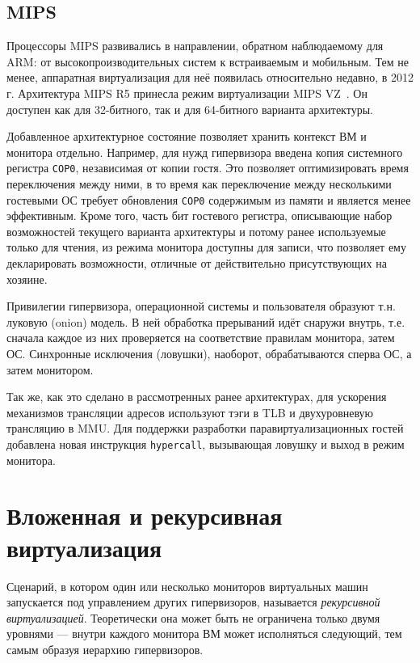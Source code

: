 \subsection{MIPS}

Процессоры MIPS развивались в направлении, обратном наблюдаемому для ARM: от высокопроизводительных систем к встраиваемым и мобильным. Тем не менее, аппаратная виртуализация для неё появилась относительно недавно, в 2012 г. Архитектура MIPS R5 принесла режим виртуализации MIPS VZ~\cite{mips-vz}. Он доступен как для 32-битного, так и для 64-битного варианта архитектуры.

Добавленное архитектурное состояние позволяет хранить контекст ВМ и монитора отдельно. Например, для нужд гипервизора введена копия системного регистра \texttt{COP0}, независимая от копии гостя. Это позволяет оптимизировать время переключения между ними, в то время как переключение между несколькими гостевыми ОС требует обновления \texttt{COP0} содержимым из памяти и является менее эффективным. Кроме того, часть бит гостевого регистра, описывающие набор возможностей текущего варианта архитектуры и потому ранее используемые только для чтения, из режима монитора доступны для записи, что позволяет ему декларировать возможности, отличные от действительно присутствующих на хозяине.

Привилегии гипервизора, операционной системы и пользователя образуют т.н. луковую (\abbr onion) модель. В ней обработка прерываний идёт снаружи внутрь, т.е. сначала каждое из них проверяется на соответствие правилам монитора, затем ОС. Синхронные исключения (ловушки), наоборот, обрабатываются сперва ОС, а затем монитором.

Так же, как это сделано в рассмотренных ранее архитектурах, для ускорения механизмов трансляции адресов используют тэги в TLB и двухуровневую трансляцию в MMU. Для поддержки разработки паравиртуализационных гостей добавлена новая инструкция \texttt{hypercall}, вызывающая ловушку и выход в режим монитора.

\section{Вложенная и рекурсивная виртуализация}


Сценарий, в котором один или несколько мониторов виртуальных машин запускается под управлением других гипервизоров, называется \textit{рекурсивной виртуализацией}. Теоретически она может быть не ограничена только двумя уровнями — внутри каждого монитора ВМ может исполняться следующий, тем самым образуя иерархию гипервизоров.

